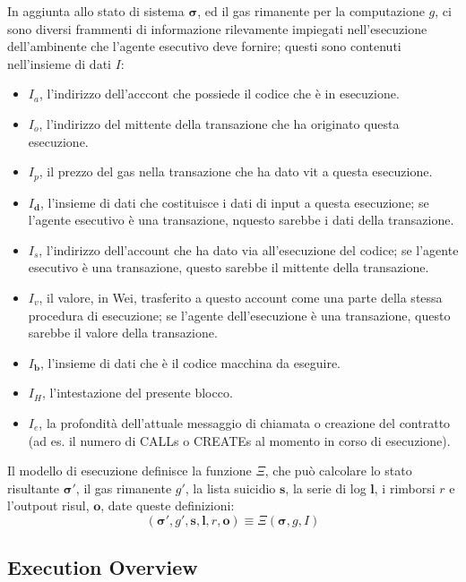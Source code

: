 \documentclass[9pt,oneside]{amsart}
\begin{document}
\begin{multicols}{2}
In aggiunta allo stato di sistema $\boldsymbol{\sigma}$, ed il gas rimanente per la computazione $g$, ci sono diversi frammenti di informazione rilevamente impiegati nell'esecuzione dell'ambinente che l'agente esecutivo deve fornire; questi sono contenuti nell'insieme di dati $I$:

\begin{itemize}
\item $I_a$, l'indirizzo dell'acccont che possiede il codice che è in esecuzione.
\item $I_o$, l'indirizzo del mittente della transazione che ha originato questa esecuzione.
\item $I_p$, il prezzo del gas nella transazione che ha dato vit a questa esecuzione.
\item $I_\mathbf{d}$, l'insieme di dati che costituisce i dati di input a questa esecuzione; se l'agente esecutivo è una transazione, nquesto sarebbe i dati della transazione.
\item $I_s$, l'indirizzo dell'account che ha dato via all'esecuzione del codice; se l'agente esecutivo è una transazione, questo sarebbe il mittente della transazione.
\item $I_v$, il valore, in Wei, trasferito a questo account come una parte della stessa procedura di esecuzione; se l'agente dell'esecuzione è una transazione, questo sarebbe il valore della transazione.
\item $I_\mathbf{b}$, l'insieme di dati che è il codice macchina da eseguire.
\item $I_H$, l'intestazione del presente blocco.
\item $I_e$, la profondità dell'attuale messaggio di chiamata o creazione del contratto (ad es. il numero di {\small CALL}s o {\small CREATE}s al momento in corso di esecuzione).
\end{itemize}

Il modello di esecuzione definisce la funzione $\Xi$, che può calcolare lo stato risultante $\boldsymbol{\sigma}'$, il gas rimanente $g'$, la lista suicidio $\mathbf{s}$, la serie di log $\mathbf{l}$, i rimborsi $r$ e l'outpout risul, $\mathbf{o}$, date queste definizioni:
\begin{equation}
(\boldsymbol{\sigma}', g', \mathbf{s}, \mathbf{l}, r, \mathbf{o}) \equiv \Xi(\boldsymbol{\sigma}, g, I)
\end{equation}

\subsection{Execution Overview}


\end{multicols}
\end{document}
